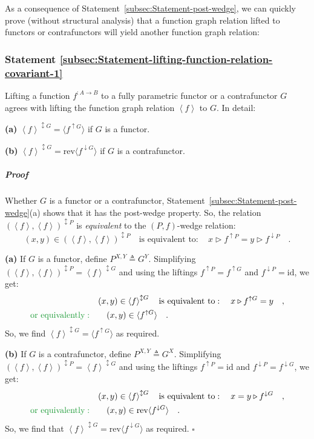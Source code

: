 As a consequence of Statement~\ref{subsec:Statement-post-wedge},
we can quickly prove (without structural analysis) that a function
graph relation lifted to functors or contrafunctors will yield another
function graph relation:

\subsubsection{Statement \label{subsec:Statement-lifting-function-relation-covariant-1}\ref{subsec:Statement-lifting-function-relation-covariant-1}}

Lifting a function $f^{:A\rightarrow B}$ to a fully parametric functor
or a contrafunctor $G$ agrees with lifting the function graph relation
$\left<f\right>$ to $G$. In detail: 

\textbf{(a)} $\left<f\right>^{\updownarrow G}=\langle f^{\uparrow G}\rangle$
if $G$ is a functor.

\textbf{(b)} $\left<f\right>^{\updownarrow G}=\text{rev}\langle f^{\downarrow G}\rangle$
if $G$ is a contrafunctor.

\subparagraph{Proof}

Whether $G$ is a functor or a contrafunctor, Statement~\ref{subsec:Statement-post-wedge}(a)
shows that it has the post-wedge property. So, the relation $(\left<f\right>,\left<f\right>)^{\updownarrow P}$
is \emph{equivalent} to the $\left(P,f\right)$-wedge relation:
\[
(x,y)\in(\left<f\right>,\left<f\right>)^{\updownarrow P}\quad\text{is equivalent to}:\quad x\triangleright f^{\uparrow P}=y\triangleright f^{\downarrow P}\quad.
\]

\textbf{(a)} If $G$ is a functor, define $P^{X,Y}\triangleq G^{Y}$.
Simplifying $(\left<f\right>,\left<f\right>)^{\updownarrow P}=\left<f\right>^{\updownarrow G}$
and using the liftings $f^{\uparrow P}=f^{\uparrow G}$ and $f^{\downarrow P}=\text{id}$,
we get:
\begin{align*}
 & (x,y)\in\left<f\right>^{\updownarrow G}\quad\text{is equivalent to}:\quad x\triangleright f^{\uparrow G}=y\quad,\\
{\color{greenunder}\text{or equivalently}:}\quad & \quad(x,y)\in\langle f^{\uparrow G}\rangle\quad.
\end{align*}
So, we find $\left<f\right>^{\updownarrow G}=\langle f^{\uparrow G}\rangle$
as required.

\textbf{(b)} If $G$ is a contrafunctor, define $P^{X,Y}\triangleq G^{X}$.
Simplifying $(\left<f\right>,\left<f\right>)^{\updownarrow P}=\left<f\right>^{\updownarrow G}$
and using the liftings $f^{\uparrow P}=\text{id}$ and $f^{\downarrow P}=f^{\downarrow G}$,
we get:
\begin{align*}
 & (x,y)\in\left<f\right>^{\updownarrow G}\quad\text{is equivalent to}:\quad x=y\triangleright f^{\downarrow G}\quad,\\
{\color{greenunder}\text{or equivalently}:}\quad & \quad(x,y)\in\text{rev}\langle f^{\downarrow G}\rangle\quad.
\end{align*}
 So, we find that $\left<f\right>^{\updownarrow G}=\text{rev}\langle f^{\downarrow G}\rangle$
as required. $\square$

